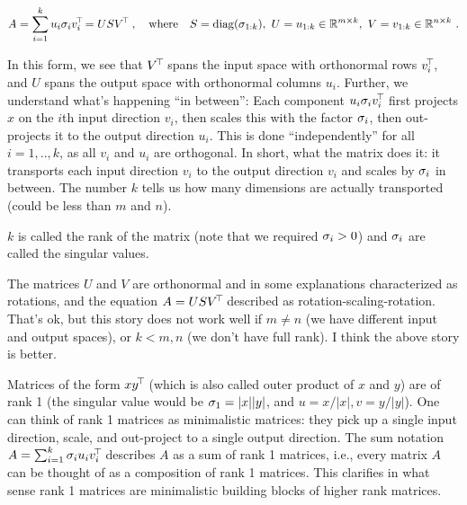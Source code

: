\begin{align}
A = \sum_{i=1}^k  u_i \sigma_i v_i^{\!\top\!} = U S V^{\!\top\!}
~,\quad\text{where}\quad S = {\rm diag}(\sigma_{1:k}),~ U=u_{1:k}\in{\mathbb{R}}^{m\times k},~ V=
v_{1:k} \in {\mathbb{R}}^{n\times k} ~.
\end{align}

In this form, we see
that $V^{\!\top\!}$ spans the input space with orthonormal rows $v_i^{\!\top\!}$, and
$U$ spans the output space with orthonormal columns $u_i$. Further, we
understand what's happening ``in between'': 
Each component $u_i \sigma_i v_i^{\!\top\!}$ first projects $x$ on the $i$th input
direction $v_i$, then scales this with the factor $\sigma_i$, then
out-projects it to the output direction $u_i$. This is done
``independently'' for all $i=1,..,k$, as all $v_i$ and $u_i$ are
orthogonal. In short, what the matrix does it: it transports each
input direction $v_i$ to the output direction $v_i$ and scales by
$\sigma_i$ in between. The number $k$ tells us how many dimensions are
actually transported (could be less than $m$ and $n$).

$k$ is called the rank of the matrix (note that we required $\sigma_i>0$)
and $\sigma_i$ are called the singular values.

The matrices $U$ and $V$ are orthonormal
and in some explanations characterized as rotations, and the equation
$A=U S V^{\!\top\!}$ described as rotation-scaling-rotation. That's ok, but
this story does not work well if $m\not= n$ (we have different input
and output spaces), or $k<m,n$ (we don't have full rank). I think the
above story is better.

Matrices of the form $x y^{\!\top\!}$ (which is also called outer product of
$x$ and $y$) are of rank 1 (the singular
value would be $\sigma_1 = |x||y|$, and $u=x/|x|, v=y/|y|$). One can think of rank 1 matrices as
minimalistic matrices: they pick up a single input direction, scale,
and out-project to a single output direction. The sum notation $A = \sum_{i=1}^k  \sigma_i u_i v_i^{\!\top\!}$ describes $A$ as
a sum of rank 1 matrices, i.e., every matrix $A$ can be thought of as a
composition of rank 1 matrices. This clarifies in what sense rank
1 matrices are minimalistic building blocks of higher
rank matrices.


